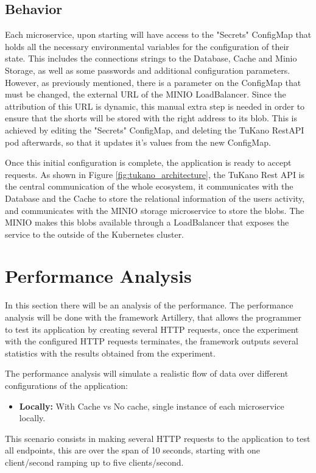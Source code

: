 \documentclass[10pt,a4paper,twocolumn]{article}
\begin{document}
\subsection{Behavior}
\label{sec:behaviour}
Each microservice, upon starting will have access to the "Secrets" ConfigMap that holds all the necessary environmental variables for the configuration of their state. This includes the connections strings to the Database, Cache and Minio Storage, as well as some passwords and additional configuration parameters. However, as previously mentioned, there is a parameter on the ConfigMap that must be changed, the external URL of the MINIO LoadBalancer. Since the attribution of this URL is dynamic, this manual extra step is needed in order to ensure that the shorts will be stored with the right address to its blob. This is achieved by editing the "Secrets" ConfigMap, and deleting the TuKano RestAPI pod afterwards, so that it updates it's values from the new ConfigMap.
\par Once this initial configuration is complete, the application is ready to accept requests. As shown in Figure \ref{fig:tukano_architecture}, the TuKano Rest API is the central communication of the whole ecosystem, it communicates with the Database and the Cache to store the relational information of the users activity, and communicates with the MINIO storage microservice to store the blobs. The MINIO makes this blobs available through a LoadBalancer that exposes the service to the outside of the Kubernetes cluster.

\section{Performance Analysis}
\label{sec:Perf}
In this section there will be an analysis of the performance. The performance analysis will be done with the framework Artillery\cite{artillery}, that allows the programmer to test its application by creating several HTTP requests, once the experiment with the configured HTTP requests terminates, the framework outputs several statistics with the results obtained from the experiment.
\par The performance analysis will simulate a realistic flow of data over different configurations of the application:
\begin{itemize}
  \item \textbf{Locally:} With Cache vs No cache, single instance of each microservice locally.
\end{itemize}
This scenario consists in making several HTTP requests to the application to test all endpoints, this are over the span of 10 seconds, starting with one client/second ramping up to five clients/second.
\end{document}
